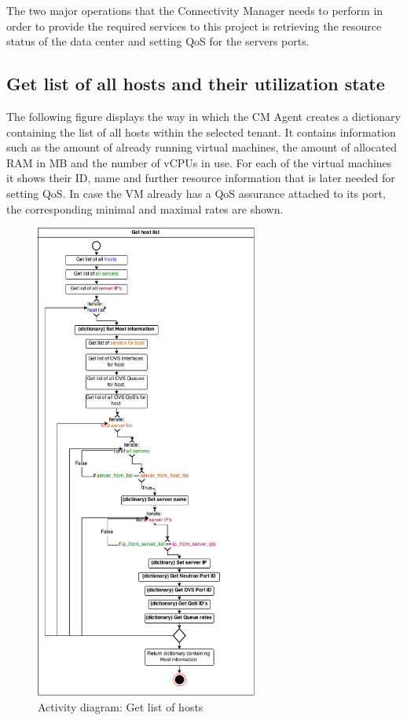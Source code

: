The two major operations that the Connectivity Manager needs to perform in order to provide the required services to this project is retrieving the resource status of the data center and setting QoS for the servers ports.

\subsection{Get list of all hosts and their utilization state}

The following figure displays the way in which the CM Agent creates a dictionary containing the list of all hosts within the selected tenant. It contains information such as the amount of already running virtual machines, the amount of allocated RAM in MB and the number of vCPUs in use. For each of the virtual machines it shows their ID, name and further resource information that is later needed for setting QoS. In case the VM already has a QoS assurance attached to its port, the corresponding minimal and maximal rates are shown.

\begin{figure}[H]
\centering

\includegraphics[width=0.65\textwidth]{images/design/activity_host_list}

\caption{Activity diagram: Get list of hosts}
\end{figure}

